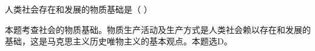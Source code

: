 \question 人类社会存在和发展的物质基础是（ ）
\par{}
\begin{solution}本题考查社会的物质基础。物质生产活动及生产方式是人类社会赖以存在和发展的基础，这是马克思主义历史唯物主义的基本观点。本题选D。
\end{solution}

